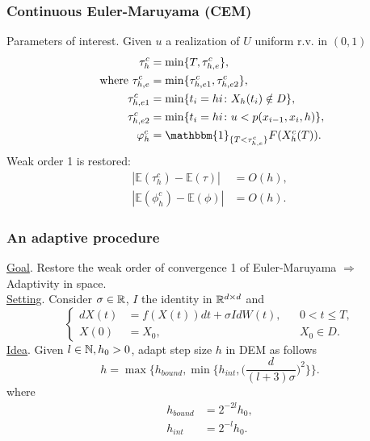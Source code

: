 \begin{frame}
\frametitle{Continuous Euler-Maruyama (CEM)}
Parameters of interest. Given $u$ a realization of $U$ uniform r.v. in $(0,1)$
\begin{equation*}
\begin{aligned}
	\tau_h^c &= \min \{T,\tau_{h,e}^c\}, \\
	\text{ where } \tau_{h,e}^c &= \min\{\tau_{h,e1}^c, \tau_{h,e2}^c\}, \\
	\tau_{h,e1}^c &= \min\{t_i = hi \colon X_h(t_i) \notin D\}, \\
	\tau_{h,e2}^c &= \min\{t_i = hi \colon u < p(x_{i-1},x_i,h) \}, \\
	\phi_h^c &= \mathbbm{1}_{\{T < \tau_{h,e}^c\}}F(X_h^c(T)).
\end{aligned}
\end{equation*}
Weak order 1 is restored:
\begin{align*}
	|\mathbb{E}(\tau_h^c) - \mathbb{E}(\tau)| &= O(h), \\
	|\mathbb{E}(\phi_h^c) - \mathbb{E}(\phi)| &= O(h).
\end{align*}
\end{frame}

\begin{frame} %
\frametitle{An adaptive procedure}
\underline{Goal}. Restore the weak order of convergence 1 of Euler-Maruyama $\Rightarrow$ Adaptivity in space. \\
\underline{Setting}. Consider $\sigma \in \mathbb{R}$, $I$ the identity in $\mathbb{R}^{d \times d}$ and
\begin{equation*}
\left \{
\begin{aligned}
	dX(t) &= f(X(t)) dt + \sigma I dW(t), && 0 < t \leq T, \\
	X(0)  &= X_0, && X_0 \in D.
\end{aligned} \right .
\end{equation*}
\underline{Idea}. Given $l \in \mathbb{N}, h_0 > 0$, adapt step size $h$ in DEM as follows
\begin{equation*}
	h = \max\Big\{ h_{bound}, \min\Big\{ h_{int}, \Big(\frac{d}{(l + 3)\sigma}\Big)^2\Big\}\Big\}.
\end{equation*}
where
\begin{equation*}
\begin{aligned}
	h_{bound} &= 2^{-2l}h_0, \\
	h_{int} &= 2^{-l}h_0.
\end{aligned}
\end{equation*}
\end{frame}

